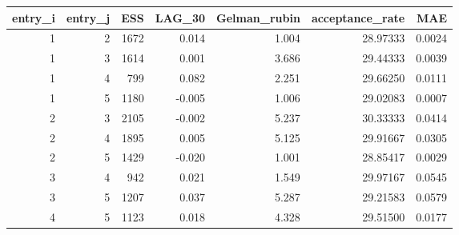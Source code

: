 \begin{longtable}{rrrrrrr}
\toprule
entry\_i & entry\_j & ESS & LAG\_30 & Gelman\_rubin & acceptance\_rate & MAE \\ 
\midrule
1 & 2 & 1672 & 0.014 & 1.004 & 28.97333 & 0.0024 \\ 
1 & 3 & 1614 & 0.001 & 3.686 & 29.44333 & 0.0039 \\ 
1 & 4 & 799 & 0.082 & 2.251 & 29.66250 & 0.0111 \\ 
1 & 5 & 1180 & -0.005 & 1.006 & 29.02083 & 0.0007 \\ 
2 & 3 & 2105 & -0.002 & 5.237 & 30.33333 & 0.0414 \\ 
2 & 4 & 1895 & 0.005 & 5.125 & 29.91667 & 0.0305 \\ 
2 & 5 & 1429 & -0.020 & 1.001 & 28.85417 & 0.0029 \\ 
3 & 4 & 942 & 0.021 & 1.549 & 29.97167 & 0.0545 \\ 
3 & 5 & 1207 & 0.037 & 5.287 & 29.21583 & 0.0579 \\ 
4 & 5 & 1123 & 0.018 & 4.328 & 29.51500 & 0.0177 \\ 
\bottomrule
\end{longtable}

